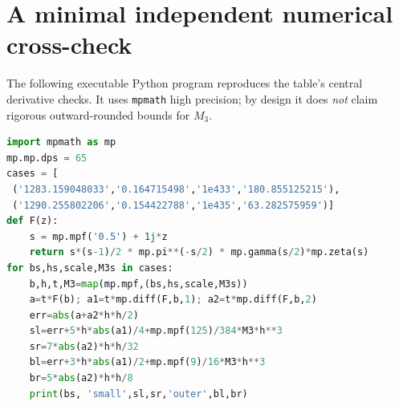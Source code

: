 \documentclass[11pt,reqno]{amsart}
\numberwithin{equation}{section}
\theoremstyle{definition}
\theoremstyle{remark}
\begin{document}
\appendix
\section{A minimal independent numerical cross-check}\label{app:precheck}
The following executable Python program reproduces the table's central derivative checks. It uses \texttt{mpmath} high precision; by design it does \emph{not} claim rigorous outward-rounded bounds for $M_3$.
\begin{lstlisting}[language=Python]
import mpmath as mp
mp.mp.dps = 65
cases = [
 ('1283.159048033','0.164715498','1e433','180.855125215'),
 ('1290.255802206','0.154422788','1e435','63.282575959')]
def F(z):
    s = mp.mpf('0.5') + 1j*z
    return s*(s-1)/2 * mp.pi**(-s/2) * mp.gamma(s/2)*mp.zeta(s)
for bs,hs,scale,M3s in cases:
    b,h,t,M3=map(mp.mpf,(bs,hs,scale,M3s))
    a=t*F(b); a1=t*mp.diff(F,b,1); a2=t*mp.diff(F,b,2)
    err=abs(a+a2*h*h/2)
    sl=err+5*h*abs(a1)/4+mp.mpf(125)/384*M3*h**3
    sr=7*abs(a2)*h*h/32
    bl=err+3*h*abs(a1)/2+mp.mpf(9)/16*M3*h**3
    br=5*abs(a2)*h*h/8
    print(bs, 'small',sl,sr,'outer',bl,br)
\end{lstlisting}
\end{document}
